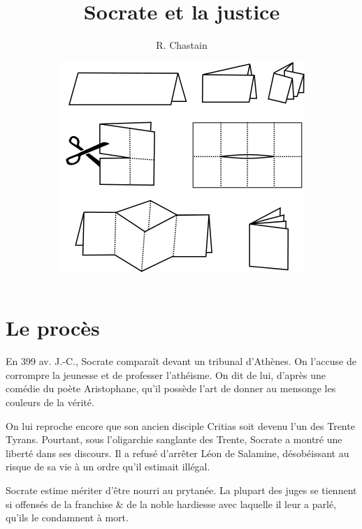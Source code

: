 \documentclass[fontsize=28pt,a4paper]{scrartcl}
\title{Socrate et la justice}
\author{\small R. Chastain}
\date{\includegraphics[width=.75\textwidth]{folding-minibook}}
\begin{document}
\maketitle
\thispagestyle{empty}
\clearpage

\section{Le procès}

En 399 av. J.-C., Socrate comparaît devant un tribunal d'Athènes. On l'accuse de corrompre la jeunesse et de professer l'athéisme. On dit de lui, d'après une comédie du poète Aristophane, qu'il possède l'art de donner au mensonge les couleurs de la vérité.

On lui reproche encore que son ancien disciple Critias soit devenu l'un des Trente Tyrans. Pourtant, sous l'oligarchie sanglante des Trente, Socrate a montré une liberté dans ses discours. Il a refusé d'arrêter Léon de Salamine, désobéissant au risque de sa vie à un ordre qu'il estimait illégal.


Socrate estime mériter d'être nourri au prytanée. La plupart des juges se tiennent si offensés de la franchise \& de la noble hardiesse avec laquelle il leur a parlé, qu'ils le condamnent à mort.

\end{document}
